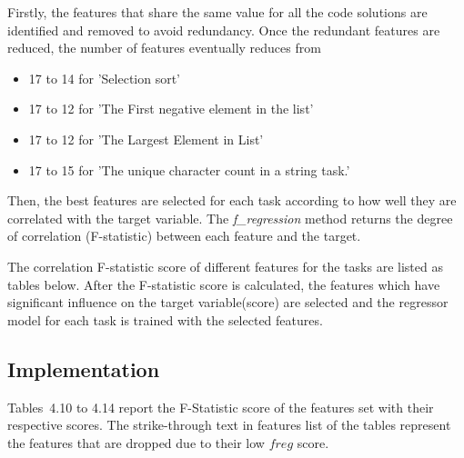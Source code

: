 Firstly, the features that share the same value for all the
code solutions are identified and removed to avoid
redundancy. Once the redundant features are reduced, the
number of features eventually reduces from
\begin{itemize}
\item 17 to 14 for 'Selection sort'
\item 17 to 12 for 'The First negative element in the list'
\item 17 to 12 for 'The Largest Element in List'
\item 17 to 15 for 'The unique character count in a string
  task.'
\end{itemize}
Then, the best features are selected for each task according
to how well they are correlated with the target variable. The
\emph{f\_regression} method \cite{H} returns the degree of
correlation (F-statistic) between each feature and the
target.

The correlation F-statistic score of different features for
the tasks are listed as tables below. After the F-statistic
score is calculated, the features which have significant
influence on the target variable(score) are selected and the
regressor model for each task is trained with the selected
features.

\subsection{Implementation}

Tables~4.10 to 4.14 report the F-Statistic score of the
features set with their respective scores. The strike-through
text in features list of the tables represent the features
that are dropped due to their low $f{reg}$ score.

